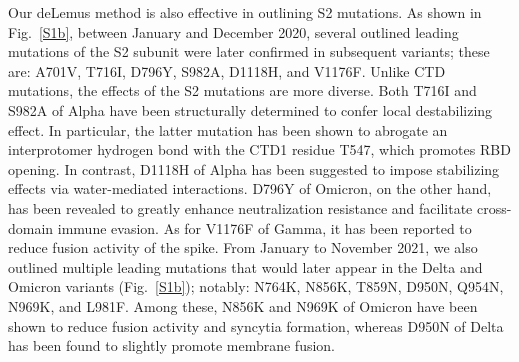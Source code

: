 \documentclass[aps,prl,amsmath,amssymb,floatfix,twocolumn, amsmath, superscriptaddress, onecolumn]{revtex4}
\newcommand{\fref}[1]{Fig.~\ref{#1}}%
\begin{document}
Our deLemus method is also effective in outlining S2 mutations. As shown in \fref{S1b}, between January and December 2020, several outlined leading mutations of the S2 subunit were later confirmed in subsequent variants; these are: A701V, T716I, D796Y, S982A, D1118H, and V1176F. Unlike CTD mutations, the effects of the S2 mutations are more diverse.\cite{10.3390/v14030640} Both T716I and S982A of Alpha have been structurally determined to confer local destabilizing effect.\cite{10.1126/science.abi6226} In particular, the latter mutation has been shown to abrogate an interprotomer hydrogen bond with the CTD1 residue T547, which promotes RBD opening.\cite{10.1126/science.abi6226} In contrast, D1118H of Alpha has been suggested to impose stabilizing effects via water-mediated interactions.\cite{10.1038/s41421-021-00349-z} D796Y of Omicron, on the other hand, has been revealed to greatly enhance neutralization resistance and facilitate cross-domain immune evasion.\cite{10.1128/jvi.00922-23, 10.1128/spectrum.03291-23} As for V1176F of Gamma, it has been reported to reduce fusion activity of the spike.\cite{10.1073/pnas.2119467119} From January to November 2021, we also outlined multiple leading mutations that would later appear in the Delta and Omicron variants (\fref{S1b}); notably: N764K, N856K, T859N, D950N, Q954N, N969K, and L981F. Among these, N856K and N969K of Omicron have been shown to reduce fusion activity and syncytia formation,\cite{10.1016/j.celrep.2022.110729, 10.1038/s41392-022-01281-8, 10.1038/s42003-023-04923-x, 10.1080/22221751.2023.2297553} whereas D950N of Delta has been found to slightly promote membrane fusion.\cite{10.1016/j.ebiom.2023.104561}
\end{document}
